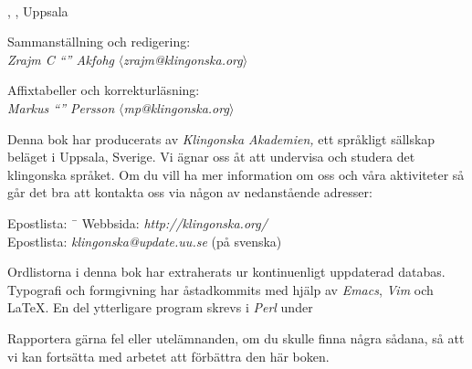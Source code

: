 \begin{center}
  \\
  \edition{}, \compiledate{}, Uppsala

  \vspace{4mm}
  \small Sammanställning och redigering: \\
  \textit{Zrajm C ``'' Akfohg}
  $\langle$\textit{zrajm@klingonska.org}$\rangle$ 

  \vspace{2mm}
  Affixtabeller och korrekturläsning:\\
  \textit{Markus ``'' Persson}
  $\langle$\textit{mp@klingonska.org}$\rangle$
\end{center}


\small\noindent Denna bok har producerats av \textit{Kling\-on\-ska
Aka\-demi\-en,} ett språkligt sällskap beläget i Uppsala, Sverige. Vi
ägnar oss åt att undervisa och studera det klingonska språket. Om du
vill ha mer information om oss och våra aktiviteter så går det bra att
kontakta oss via någon av nedanstående adresser:

\begin{tabbing}
\indent Epostlista: \ \= \kill
\indent Webbsida: \> \textit{http://klingonska.org/}\\
\indent Epostlista: \> \textit{klingonska@update.uu.se} (på svenska)
\end{tabbing}

\noindent Ordlistorna i denna bok har extraherats ur
kontinuenligt uppdaterad databas. Typografi och formgivning har åstadkommits
med hjälp av \textit{Emacs}, \textit{Vim} och \LaTeX. En del ytterligare
program skrevs i \textit{Perl} under 

Rapportera gärna fel eller utelämnanden, om du skulle finna några
sådana, så att vi kan fortsätta med arbetet att förbättra den här
boken.

\newpage
\normalsize
